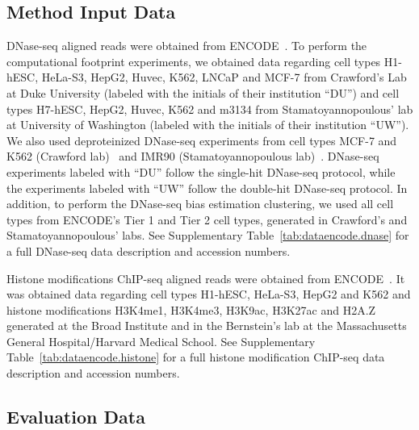 \subsection{Method Input Data}
\label{sec:method.input.data}

DNase-seq aligned reads were obtained from ENCODE~\cite{encode2012}. To perform the computational footprint experiments, we obtained data regarding cell types H1-hESC, HeLa-S3, HepG2, Huvec, K562, LNCaP and MCF-7 from Crawford's Lab at Duke University (labeled with the initials of their institution ``DU'') and cell types H7-hESC, HepG2, Huvec, K562 and m3134 from Stamatoyannopoulous' lab at University of Washington (labeled with the initials of their institution ``UW''). We also used deproteinized DNase-seq experiments from cell types MCF-7 and K562 (Crawford lab)~\cite{yardimci2014} and IMR90 (Stamatoyannopoulous lab)~\cite{lazarovici2013}. DNase-seq experiments labeled with ``DU'' follow the single-hit DNase-seq protocol, while the experiments labeled with ``UW'' follow the double-hit DNase-seq protocol. In addition, to perform the DNase-seq bias estimation clustering, we used all cell types from ENCODE's Tier 1 and Tier 2 cell types, generated in Crawford's and Stamatoyannopoulous' labs. See Supplementary Table~\ref{tab:dataencode.dnase} for a full DNase-seq data description and accession numbers.

Histone modifications ChIP-seq aligned reads were obtained from ENCODE~\cite{encode2012}. It was obtained data regarding cell types H1-hESC, HeLa-S3, HepG2 and K562 and histone modifications H3K4me1, H3K4me3, H3K9ac, H3K27ac and H2A.Z generated at the Broad Institute and in the Bernstein's lab at the Massachusetts General Hospital/Harvard Medical School. See Supplementary Table~\ref{tab:dataencode.histone} for a full histone modification ChIP-seq data description and accession numbers.

\subsection{Evaluation Data}
\label{sec:evaluation.data}

